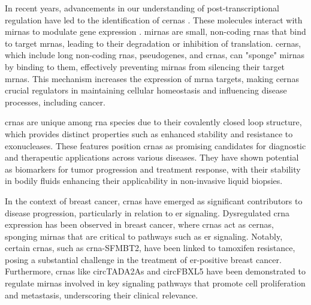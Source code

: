 In recent years, advancements in our understanding of post-transcriptional
regulation have led to the identification of \glspl{cerna}
\supercite{salmena_cerna_2011,tay_multilayered_2014}.
These molecules interact with \glspl{mirna} to modulate gene expression
\supercite{salmena_cerna_2011,li_long_2017}.
\glspl{mirna} are small, non-coding \glspl{rna} that bind to target
\glspl{mrna},
leading to their degradation or inhibition of
translation\supercite{salmena_cerna_2011,tay_multilayered_2014}.
\Glspl{cerna}, which include long non-coding \glspl{rna}, pseudogenes, and
\glspl{crna}, can
"sponge" \glspl{mirna} by binding to them, effectively preventing \glspl{mirna}
from silencing their target
\glspl{mrna}\supercite{salmena_cerna_2011,poliseno_coding-independent_2010}.
This mechanism increases the expression of \gls{mrna} targets, making
\glspl{cerna} crucial regulators in maintaining cellular homeostasis and
influencing disease processes, including
cancer\supercite{salmena_cerna_2011,vo_landscape_2019}.

\Glspl{crna} are unique among \gls{rna} species due to their covalently closed
loop
structure, which provides distinct properties such as enhanced stability and
resistance to exonucleases\supercite{vo_landscape_2019}.
These features position \glspl{crna} as promising candidates for diagnostic and
therapeutic applications across various
diseases\supercite{ma_circular_2020,hoque_exploring_2023,wilusz_circular_2017}.
They have shown potential as biomarkers for tumor progression and treatment
response\supercite{bao_prognostic_2020,ren_construction_2017}, with their
stability in bodily fluids enhancing their applicability in non-invasive liquid
biopsies\supercite{bao_prognostic_2020,zhang_circular_2018}.

In the context of breast cancer, \glspl{crna} have emerged as significant
contributors to disease progression, particularly in relation to \gls{er} signaling.
Dysregulated \gls{crna} expression has been observed in breast cancer, where
\glspl{crna} act as \glspl{cerna}, sponging \glspl{mirna} that are critical to
pathways such as \gls{er} signaling\supercite{nair_circular_2016,xu_circrna_2022}.
Notably, certain \glspl{crna}, such as \gls{crna}-SFMBT2, have been linked to
tamoxifen resistance, posing a substantial challenge in the treatment of
\gls{er}-positive breast cancer\supercite{li_circrna-sfmbt2_2023}.
Furthermore, \glspl{crna} like circTADA2As and circFBXL5 have been demonstrated
to regulate \glspl{mirna} involved in key signaling pathways that promote cell
proliferation and metastasis, underscoring their clinical
relevance\supercite{xu_circtada2as_2019,gao_hsa_circrna_0006528_2019}.


